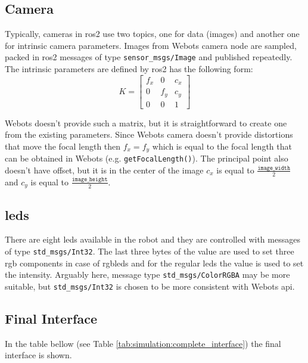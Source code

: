 \subsection{Camera}
Typically, cameras in \ac{ros2} use two topics, one for data (images) and another one for intrinsic camera parameters.
Images from Webots camera node are sampled, packed in \ac{ros2} messages of type \texttt{sensor\_msgs/Image} and published repeatedly.
The intrinsic parameters are defined by \ac{ros2} has the following form:
\begin{equation}
K = \begin{bmatrix}
    f_x & 0 & c_x \\
    0 & f_y & c_y \\
    0 & 0 & 1
\end{bmatrix}
\end{equation}

Webots doesn't provide such a matrix, but it is straightforward to create one from the existing parameters.
Since Webots camera doesn't provide distortions that move the focal length then $f_x = f_y$ which is equal to the focal length that can be obtained in Webots (e.g. \texttt{getFocalLength()}).
The principal point also doesn't have offset, but it is in the center of the image $c_x$ is equal to $ \frac{\texttt{image\_width}}{2} $ and $c_y$ is equal to $ \frac{\texttt{image\_height}}{2} $.

\subsection{\acsp{led}}
There are eight \acsp{led} available in the robot and they are controlled with messages of type \texttt{std\_msgs/Int32}.
The last three bytes of the value are used to set three \ac{rgb} components in case of \acsp{rgbled} and for the regular \acp{led} the value is used to set the intensity.
Arguably here, message type \texttt{std\_msgs/ColorRGBA} may be more suitable, but \texttt{std\_msgs/Int32} is chosen to be more consistent with Webots \ac{api}.

\subsection{Final Interface}

In the table bellow (see Table \ref{tab:simulation:complete_interface}) the final interface is shown.

